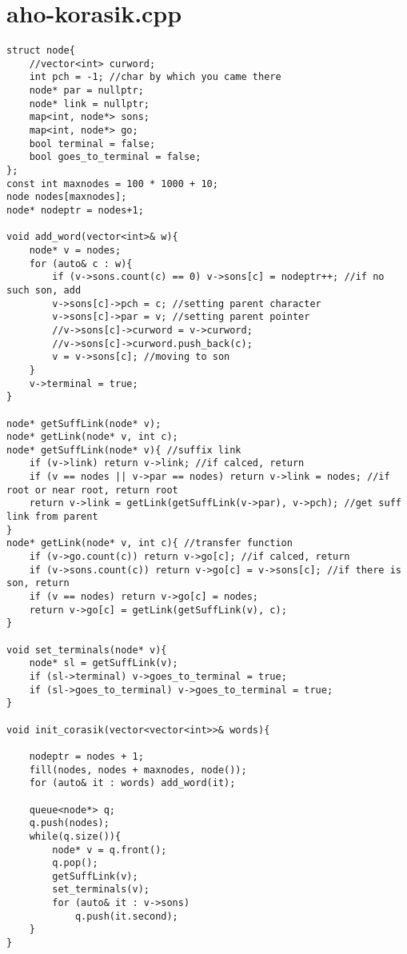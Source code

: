 \documentclass[a4paper,12pt]{report}
\begin{document}
\tableofcontents
\newpage


\section{aho-korasik.cpp}
\begin{lstlisting}
struct node{
    //vector<int> curword;
    int pch = -1; //char by which you came there
    node* par = nullptr;
    node* link = nullptr;
    map<int, node*> sons;
    map<int, node*> go;
    bool terminal = false;
    bool goes_to_terminal = false;
};
const int maxnodes = 100 * 1000 + 10;
node nodes[maxnodes];
node* nodeptr = nodes+1;

void add_word(vector<int>& w){
    node* v = nodes;
    for (auto& c : w){
        if (v->sons.count(c) == 0) v->sons[c] = nodeptr++; //if no such son, add
        v->sons[c]->pch = c; //setting parent character
        v->sons[c]->par = v; //setting parent pointer
        //v->sons[c]->curword = v->curword;
        //v->sons[c]->curword.push_back(c);
        v = v->sons[c]; //moving to son
    }
    v->terminal = true;
}

node* getSuffLink(node* v);
node* getLink(node* v, int c);
node* getSuffLink(node* v){ //suffix link
    if (v->link) return v->link; //if calced, return
    if (v == nodes || v->par == nodes) return v->link = nodes; //if root or near root, return root
    return v->link = getLink(getSuffLink(v->par), v->pch); //get suff link from parent
}
node* getLink(node* v, int c){ //transfer function
    if (v->go.count(c)) return v->go[c]; //if calced, return
    if (v->sons.count(c)) return v->go[c] = v->sons[c]; //if there is son, return
    if (v == nodes) return v->go[c] = nodes;
    return v->go[c] = getLink(getSuffLink(v), c);
}

void set_terminals(node* v){
    node* sl = getSuffLink(v);
    if (sl->terminal) v->goes_to_terminal = true;
    if (sl->goes_to_terminal) v->goes_to_terminal = true;
}

void init_corasik(vector<vector<int>>& words){

    nodeptr = nodes + 1;
    fill(nodes, nodes + maxnodes, node());
    for (auto& it : words) add_word(it);

    queue<node*> q;
    q.push(nodes);
    while(q.size()){
        node* v = q.front();
        q.pop();
        getSuffLink(v);
        set_terminals(v);
        for (auto& it : v->sons)
            q.push(it.second);
    }
}


\end{lstlisting}
\end{document}
